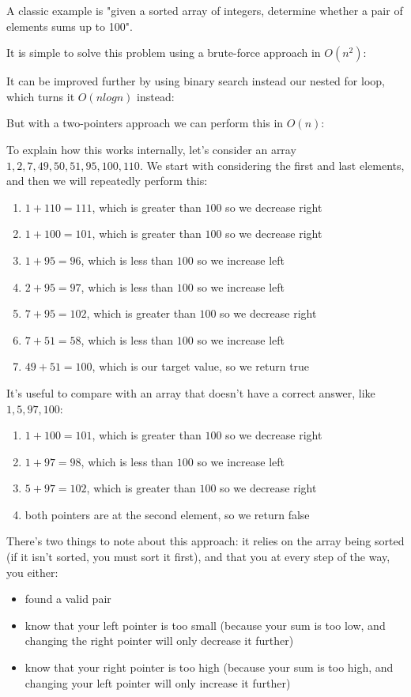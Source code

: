 A classic example is "given a sorted array of integers, determine whether a pair of elements sums up to 100".

It is simple to solve this problem using a brute-force approach in $O(n^2)$:


It can be improved further by using binary search instead our nested for loop, which turns it $O(n log n)$ instead:


But with a two-pointers approach we can perform this in $O(n)$:


To explain how this works internally, let's consider an array $1,2,7,49,50,51,95,100,110$. We start with considering the first and last elements, and then we will repeatedly perform this:
\begin{enumerate}
\item $1 + 110 = 111$, which is greater than $100$ so we decrease right
\item $1 + 100 = 101$, which is greater than $100$ so we decrease right
\item $1 + 95 = 96$, which is less than $100$ so we increase left
\item $2 + 95 = 97$, which is less than $100$ so we increase left
\item $7 + 95 = 102$, which is greater than $100$ so we decrease right
\item $7 + 51 = 58$, which is less than $100$ so we increase left
\item $49 + 51 = 100$, which is our target value, so we return true
\end{enumerate}

It's useful to compare with an array that doesn't have a correct answer, like $1,5,97,100$:
\begin{enumerate}
\item $1 + 100 = 101$, which is greater than $100$ so we decrease right
\item $1 + 97 = 98$, which is less than $100$ so we increase left
\item $5 + 97 = 102$, which is greater than $100$ so we decrease right
\item both pointers are at the second element, so we return false
\end{enumerate}

There's two things to note about this approach: it relies on the array being sorted (if it isn't sorted, you must sort it first), and that you at every step of the way, you either:
\begin{itemize}
\item found a valid pair
\item know that your left pointer is too small (because your sum is too low, and changing the right pointer will only decrease it further)
\item know that your right pointer is too high (because your sum is too high, and changing your left pointer will only increase it further)
\end{itemize}


